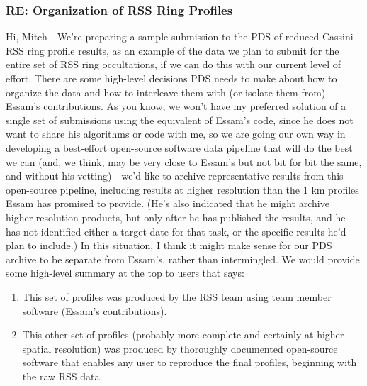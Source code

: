 \documentclass[crop=false,class=book]{standalone}
\begin{document}
\subsubsection{\footnotesize RE: Organization of RSS Ring Profiles}
Hi, Mitch - We're preparing a sample submission to the PDS of reduced Cassini RSS ring profile results, as an example of the data we plan to submit for the entire set of RSS ring occultations, if we can do this with our current level of effort. There are some high-level decisions PDS needs to make about how to organize the data and how to interleave them with (or isolate them from) Essam's contributions. As you know, we won't have my preferred solution of a single set of submissions using the equivalent of Essam's code, since he does not want to share his algorithms or code with me, so we are going our own way in developing a best-effort open-source software data pipeline that will do the best we can (and, we think, may be very close to Essam's but not bit for bit the same, and without his vetting) - we'd like to archive representative results from this open-source pipeline, including results at higher resolution than the 1 km profiles Essam has promised to provide. (He's also indicated that he might archive higher-resolution products, but only after he has published the results, and he has not identified either a target date for that task, or the specific results he'd plan to include.) In this situation, I think it might make sense for our PDS archive to be separate from Essam's, rather than intermingled. We would provide some high-level summary at the top to users that says:
\begin{enumerate}
    \item This set of profiles was produced by the RSS team using team member software (Essam's contributions).
    \item This other set of profiles (probably more complete and certainly at higher spatial resolution) was produced by thoroughly documented open-source software that enables any user to reproduce the final profiles, beginning with the raw RSS data.
\end{enumerate}
\end{document}
